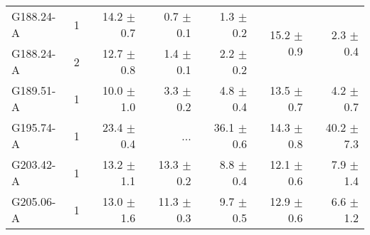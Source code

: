 \documentclass[printer]{aa}
\begin{document}
\begin{table*}[t]
\begin{tabular}{l l r r r r r}
G188.24-A & 1 & 14.2 $\pm$ 0.7 &  0.7 $\pm$ 0.1 &  1.3 $\pm$ 0.2 & \multirow{2}{*}{15.2 $\pm$ 0.9} &  \multirow{2}{*}{2.3 $\pm$  0.4} \\
G188.24-A & 2 & 12.7 $\pm$ 0.8 &  1.4 $\pm$ 0.1 &  2.2 $\pm$ 0.2 &  &   \\
G189.51-A & 1 & 10.0 $\pm$ 1.0 &  3.3 $\pm$ 0.2 &  4.8 $\pm$ 0.4 & 13.5 $\pm$ 0.7 &  4.2 $\pm$  0.7 \\
G195.74-A & 1 & 23.4 $\pm$ 0.4 &  ... & 36.1 $\pm$ 0.6 & 14.3 $\pm$ 0.8 & 40.2 $\pm$  7.3 \\
G203.42-A & 1 & 13.2 $\pm$ 1.1 & 13.3 $\pm$ 0.2 &  8.8 $\pm$ 0.4 & 12.1 $\pm$ 0.6 &  7.9 $\pm$  1.4 \\
G205.06-A & 1 & 13.0 $\pm$ 1.6 & 11.3 $\pm$ 0.3 &  9.7 $\pm$ 0.5 & 12.9 $\pm$ 0.6 &  6.6 $\pm$  1.2 \\
  \hline
		\end{tabular}
	\label{nt}
\end{table*}
\end{document}
